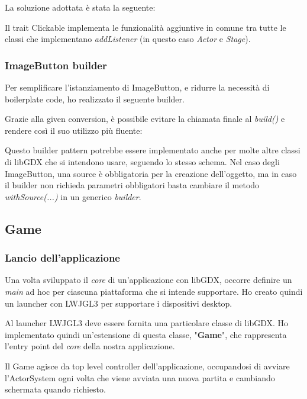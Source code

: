 La soluzione adottata è stata la seguente:



Il trait Clickable implementa le funzionalità aggiuntive in comune tra tutte le classi che implementano \textit{addListener} (in questo caso \textit{Actor} e \textit{Stage}).

\subsubsection{ImageButton builder}
Per semplificare l'istanziamento di ImageButton, e ridurre la necessità di boilerplate code, ho realizzato il seguente builder.



Grazie alla given conversion, è possibile evitare la chiamata finale al \textit{build()} e rendere così il suo utilizzo più fluente:



Questo builder pattern potrebbe essere implementato anche per molte altre classi di libGDX che si intendono usare, seguendo lo stesso schema.
Nel caso degli ImageButton, una source è obbligatoria per la creazione dell'oggetto, ma in caso il builder non richieda parametri obbligatori basta cambiare il metodo \textit{withSource(...)} in un generico \textit{builder}.


\subsection{Game}

\subsubsection{Lancio dell'applicazione}
Una volta sviluppato il \textit{core} di un'applicazione con libGDX, occorre definire un \textit{main} ad hoc per ciascuna piattaforma che si intende supportare. Ho creato quindi un launcher con LWJGL3 per supportare i dispositivi desktop.

Al launcher LWJGL3 deve essere fornita una particolare classe di libGDX. Ho implementato quindi un'estensione di questa classe, "\textbf{Game}", che rappresenta l'entry point del \textit{core} della nostra applicazione.

Il Game agisce da top level controller dell'applicazione, occupandosi di avviare l'ActorSystem ogni volta che viene avviata una nuova partita e cambiando schermata quando richiesto.

